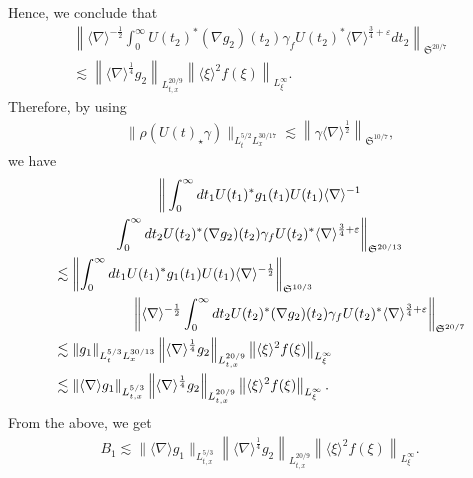 \documentclass[AHL,Unicode,longabstracts,MathTools,published]{cedram}
\newcommand{\FS}{\mathfrak{S}}
\newcommand{\ga}{\gamma}
\newcommand{\ep}{\varepsilon}
\newcommand{\rh}{\rho}
\renewcommand{\No}[1]{\left\| #1 \right\|}
\newcommand{\I}{\infty}
\newcommand{\sd}{\langle \nabla \rangle}
\newcommand{\sdi}{\sd^{-1}}
\newcommand{\lxr}{\langle \xi \rangle}
\newcommand{\tx}{{t,x}}
\newcommand{\st}{\star}
\newcommand{\ft}{{\frac{1}{4}}}
\newcommand{\fh}{\frac{3}{4}}
\newcommand{\tw}{\frac{1}{2}}
\newcommand{\na}{\nabla}
\newcommand{\ls}{\lesssim}
\begin{document}
Hence, we conclude that
\begin{multline}
\No{\sd^{-\tw}\int_0^\I U(t_2)^* (\na g_2)(t_2)\ga_f U(t_2)^* \sd^{\fh+\ep} dt_2 }_{\FS^{20/7}}\\
\ls \left\|\sd^{\ft} g_2\right\|_{L^{20/9}_\tx} \left\|\lxr^2 f(\xi)\right\|_{L^\I_\xi}.
\end{multline}
Therefore, by using
\begin{align}
\|\rh(U(t)_\st \ga)\|_{L^{5/2}_t L^{30/17}_x} \ls \left\|\ga \sd^\tw\right\|_{\FS^{10/7}},
\end{align}
we have
\begin{multline}
\bigg\|\int_0^\I dt_1 U(t_1)^* g_1(t_1) U(t_1) \sdi
\\
\int_0^\I dt_2 U(t_2)^* (\na g_2)(t_2)\ga_f U(t_2)^* \sd^{\fh+\ep} \bigg\|_{\FS^{20/13}} \\
\begin{aligned}
&\ls \No{\int_0^\I dt_1 U(t_1)^* g_1(t_1) U(t_1) \sd^{-\tw}}_{\FS^{10/3}}\\
&\mkern100mu\No{\sd^{-\tw}\int_0^\I dt_2 U(t_2)^* (\na g_2)(t_2) \ga_f U(t_2)^* \sd^{\fh+\ep} }_{\FS^{20/7}} \\
&\ls \|g_1\|_{L^{5/3}_t L^{30/13}_x} \left\|\sd^{\ft} g_2\right\|_{L^{20/9}_\tx} \left\|\lxr^2 f(\xi)\right\|_{L^\I_\xi} \\
&\ls \|\sd g_1\|_{L^{5/3}_\tx} \left\|\sd^{\ft} g_2\right\|_{L^{20/9}_\tx} \left\|\lxr^2 f(\xi)\right\|_{L^\I_\xi}.
\end{aligned}
\end{multline}
From the above, we get
\begin{align}
B_1 \ls \|\sd g_1\|_{L^{5/3}_\tx} \left\|\sd^{\ft} g_2\right\|_{L^{20/9}_\tx} \left\|\lxr^2 f(\xi)\right\|_{L^\I_\xi}.
\end{align}
\end{document}
